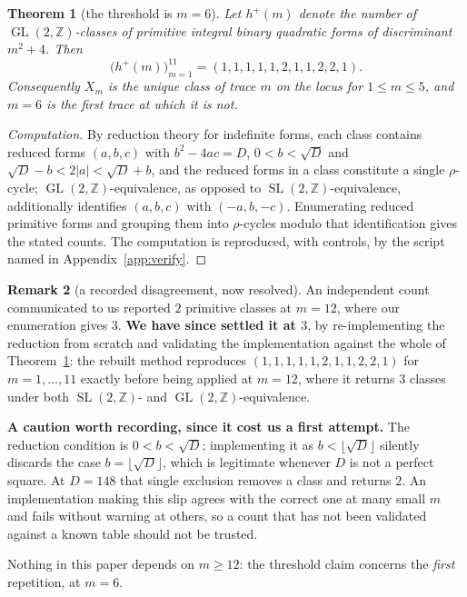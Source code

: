 \documentclass[11pt,a4paper]{article}
\newtheorem{theorem}{Theorem}[section]
\theoremstyle{definition}
\newtheorem{remark}[theorem]{Remark}
\theoremstyle{remark}
\newcommand{\GL}{\operatorname{GL}}
\newcommand{\SL}{\operatorname{SL}}
\newcommand{\Z}{\mathbb{Z}}
\begin{document}
\begin{theorem}[the threshold is $m=6$]\label{thm:classes}
Let $h^+(m)$ denote the number of $\GL(2,\Z)$-classes of primitive integral binary quadratic
forms of discriminant $m^2+4$. Then
\[
  \bigl(h^+(m)\bigr)_{m=1}^{11}=(1,1,1,1,1,2,1,1,2,2,1).
\]
Consequently $X_m$ is the \emph{unique} class of trace $m$ on the locus for $1\le m\le5$, and
$m=6$ is the first trace at which it is not.
\end{theorem}

\begin{proof}[Computation]
By reduction theory for indefinite forms, each class contains reduced forms $(a,b,c)$ with
$b^2-4ac=D$, $0<b<\sqrt{D}$ and $\sqrt{D}-b<2|a|<\sqrt{D}+b$, and the reduced forms in a
class constitute a single $\rho$-cycle; $\GL(2,\Z)$-equivalence, as opposed to
$\SL(2,\Z)$-equivalence, additionally identifies $(a,b,c)$ with $(-a,b,-c)$. Enumerating
reduced primitive forms and grouping them into $\rho$-cycles modulo that identification gives
the stated counts. The computation is reproduced, with controls, by the script named in
Appendix~\ref{app:verify}.
\end{proof}

\begin{remark}[a recorded disagreement, now resolved]\label{rem:m12}
An independent count communicated to us reported $2$ primitive classes at $m=12$, where our
enumeration gives $3$. \textbf{We have since settled it at $3$}, by re-implementing the reduction
from scratch and validating the implementation against the whole of Theorem~\ref{thm:classes}: the
rebuilt method reproduces $(1,1,1,1,1,2,1,1,2,2,1)$ for $m=1,\dots,11$ exactly before being applied
at $m=12$, where it returns $3$ classes under both $\SL(2,\Z)$- and $\GL(2,\Z)$-equivalence.

\textbf{A caution worth recording, since it cost us a first attempt.} The reduction condition is
$0<b<\sqrt{D}$; implementing it as $b<\lfloor\sqrt{D}\rfloor$ silently discards the case
$b=\lfloor\sqrt{D}\rfloor$, which is legitimate whenever $D$ is not a perfect square. At $D=148$
that single exclusion removes a class and returns $2$. An implementation making this slip agrees
with the correct one at many small $m$ and fails without warning at others, so a count that has not
been validated against a known table should not be trusted.

Nothing in this paper depends on $m\ge12$: the threshold claim concerns the \emph{first}
repetition, at $m=6$.
\end{remark}
\end{document}
